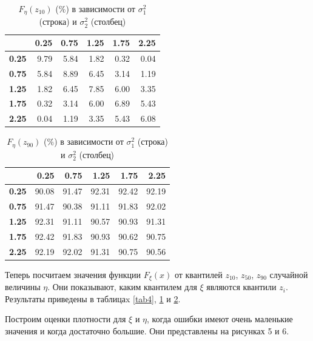 \documentclass[12pt]{article}
\begin{document}
\begin{table}[!hhh]
	\centering
	\caption{$F_{\eta}(z_{10})$ ($\%$) в зависимости от $\sigma_{1}^{2}$ (строка) и $\sigma_{2}^{2}$ (столбец) }
	\label{tab5}
	\begin{tabular}{rrrrrr}
		\hline
		& \textbf{0.25} & \textbf{0.75} & \textbf{1.25} & \textbf{1.75} & \textbf{2.25} \\ 
		\hline
		\textbf{0.25} & 9.79 & 5.84 & 1.82 & 0.32 & 0.04 \\ 
		\textbf{0.75} & 5.84 & 8.89 & 6.45 & 3.14 & 1.19 \\ 
		\textbf{1.25} & 1.82 & 6.45 & 7.85 & 6.00 & 3.35 \\ 
		\textbf{1.75} & 0.32 & 3.14 & 6.00 & 6.89 & 5.43 \\ 
		\textbf{2.25} & 0.04 & 1.19 & 3.35 & 5.43 & 6.08 \\ 
		\hline
	\end{tabular}
\end{table}

\begin{table}[!hhh]
	\centering
	\caption{$F_{\eta}(z_{90})$ ($\%$) в зависимости от $\sigma_{1}^{2}$ (строка) и $\sigma_{2}^{2}$ (столбец) }
	\label{tab6}
	\begin{tabular}{rrrrrr}
		\hline
		& \textbf{0.25} & \textbf{0.75} & \textbf{1.25} & \textbf{1.75} & \textbf{2.25} \\
		\hline
		\textbf{0.25} & 90.08 & 91.47 & 92.31 & 92.42 & 92.19 \\ 
		\textbf{0.75} & 91.47 & 90.38 & 91.11 & 91.83 & 92.02 \\ 
		\textbf{1.25} & 92.31 & 91.11 & 90.57 & 90.93 & 91.31 \\ 
		\textbf{1.75} & 92.42 & 91.83 & 90.93 & 90.62 & 90.75 \\ 
		\textbf{2.25} & 92.19 & 92.02 & 91.31 & 90.75 & 90.56 \\ 
		\hline
	\end{tabular}
\end{table}	
	
	Теперь посчитаем значения функции $F_{\xi}(x)$ от квантилей $z_{10}$, $z_{50}$, $z_{90}$ случайной величины $\eta$. Они показывают, каким квантилем для $\xi$ являются квантили $z_{i}$. Результаты приведены в таблицаx \ref{tab4}, \ref{tab5} и \ref{tab6}.
	
	Построим оценки плотности для $\xi$ и $\eta$, когда ошибки имеют очень маленькие значения и когда достаточно большие. Они представлены на рисунках 5 и 6.
	
\end{document}
